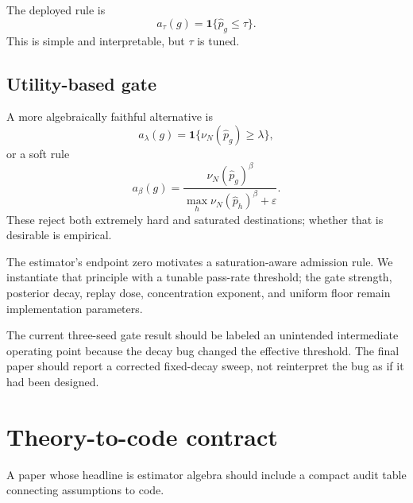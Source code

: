 \documentclass[11pt]{article}
\newcommand{\ind}{\mathbf{1}}
\theoremstyle{definition}
\theoremstyle{remark}
\begin{document}
The deployed rule is
\begin{equation}
 a_\tau(g)=\ind\{\widehat p_g\le\tau\}.
\label{eq:hard-gate}
\end{equation}
This is simple and interpretable, but $\tau$ is tuned.

\subsection{Utility-based gate}

A more algebraically faithful alternative is
\begin{equation}
 a_{\lambda}(g)=\ind\{\nu_N(\widehat p_g)\ge\lambda\},
\label{eq:utility-gate}
\end{equation}
or a soft rule
\begin{equation}
 a_{\beta}(g)
=\frac{\nu_N(\widehat p_g)^\beta}
{\max_h\nu_N(\widehat p_h)^\beta+\varepsilon}.
\label{eq:soft-gate}
\end{equation}
These reject both extremely hard and saturated destinations; whether that is desirable is empirical.

\begin{rewritebox}
The estimator's endpoint zero motivates a saturation-aware admission rule. We instantiate that principle with a tunable pass-rate threshold; the gate strength, posterior decay, replay dose, concentration exponent, and uniform floor remain implementation parameters.
\end{rewritebox}

The current three-seed gate result should be labeled an unintended intermediate operating point because the decay bug changed the effective threshold. The final paper should report a corrected fixed-decay sweep, not reinterpret the bug as if it had been designed.

\section{Theory-to-code contract}

A paper whose headline is estimator algebra should include a compact audit table connecting assumptions to code.
\end{document}
